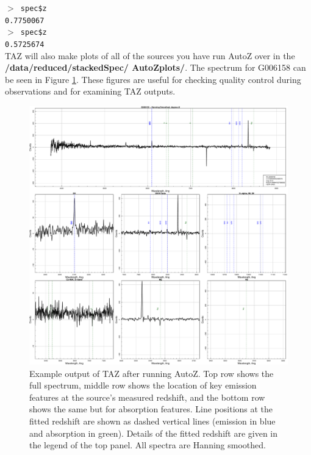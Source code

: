 \documentclass[12pt]{article}
\begin{document}
\hspace{10mm} \texttt{$>$ spec\$z} \\

\hspace{10mm} \texttt{0.7750067}\\
 
 \hspace{10mm} \texttt{$>$ spec\$z} \\
 
 \hspace{10mm} \texttt{0.5725674}\\

TAZ will also make plots of all of the sources you have run AutoZ over in the \textbf{/data/reduced/stackedSpec/ AutoZplots/}. The spectrum for G006158 can be seen in Figure \ref{fig:specEx}. These figures are useful for checking quality control during observations and for examining TAZ outputs.

\begin{figure}
\begin{center}
\includegraphics[scale=0.4]{G006158.pdf}
\caption{Example output of TAZ after running AutoZ. Top row shows the full spectrum, middle row shows the location of key emission features at the source's measured redshift, and the bottom row shows the same but for absorption features. Line positions at the fitted redshift are shown as dashed vertical lines (emission in blue and absorption in green). Details of the fitted redshift are given in the legend of the top panel. All spectra are Hanning smoothed.}
\label{fig:specEx}
\end{center}
\end{figure}
\end{document}
